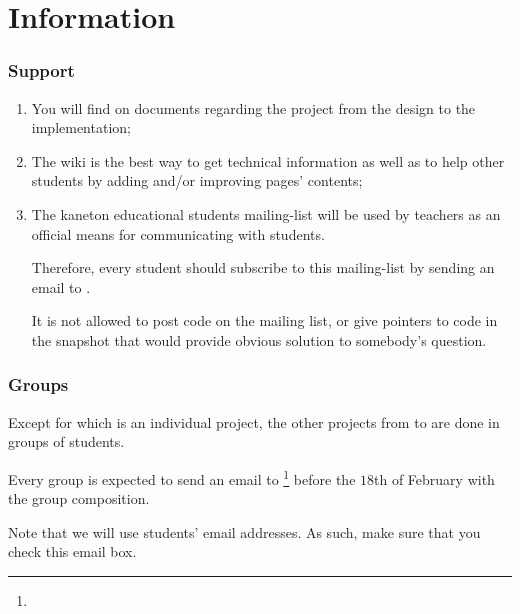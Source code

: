 %
%

\section{Information}


\begin{frame}
  \frametitle{Support}

  \begin{enumerate}
    \item

      \-

      You will find on  documents regarding
      the project from the design to the implementation;
    \item

      \-

      The wiki  is the best way to get
      technical information as well as to help other students by adding
      and/or improving pages' contents;
    \item

      \-

      The kaneton educational students mailing-list
       will be used by teachers as
      an official means for communicating with students.

      \-

      Therefore, every student should subscribe to this mailing-list by sending
      an email to .

      \-

      It is not allowed to post code on the mailing list, or give pointers to
      code in the snapshot that would provide obvious solution to somebody's
      question.
  \end{enumerate}
\end{frame}


\begin{frame}
  \frametitle{Groups}

  Except for  which is an individual project, the other projects
  from  to  are done in groups of  students.

  \-

  Every group is expected to send an email to
  \footnote{}
  before the $18$th of February with the group composition.

  \-

  Note that we will use students'  email addresses. As such,
  make sure that you check this email box.
\end{frame}


